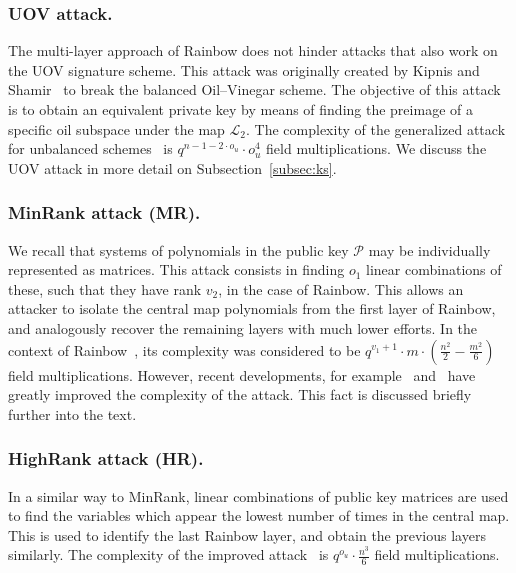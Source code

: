\documentclass[12pt, a4paper, oneside]{memoir}
\theoremstyle{definition}
\begin{document}
\subsubsection{UOV attack.} 

The multi-layer approach of Rainbow does not hinder attacks that also work on the UOV signature scheme. This attack was originally created by Kipnis and Shamir~\cite{Kipnis:199808} to break the balanced Oil--Vinegar scheme. The objective of this attack is to obtain an equivalent private key by means of finding the preimage of a specific oil subspace under the map $\mathcal{L}_{2}$. The complexity of the generalized attack for unbalanced schemes~\cite{Kipnis:199904} is $q^{n - 1 - 2 \cdot o_{u}} \cdot o_{u}^{4}$ field multiplications. We discuss the UOV attack in more detail on Subsection~\ref{subsec:ks}.

\subsubsection{MinRank attack (MR).} 

We recall that systems of polynomials in the public key $\mathcal{P}$ may be individually represented as matrices. This attack consists in finding $o_{1}$ linear combinations of these, such that they have rank $v_{2}$, in the case of Rainbow. This allows an attacker to isolate the central map polynomials from the first layer of Rainbow, and analogously recover the remaining layers with much lower efforts. In the context of Rainbow~\cite{Billet:200609,Faugere:200808}, its complexity was considered to be $q^{v_{1} + 1} \cdot m \cdot (\frac{n^{2}}{2} - \frac{m^{2}}{6})$ field multiplications. However, recent developments, for example~\cite[Tab.~3]{Bardet:202006} and~\cite{Nakamura:202007} have greatly improved the complexity of the attack. This fact is discussed briefly further into the text.

\subsubsection{HighRank attack (HR).} 

In a similar way to MinRank, linear combinations of public key matrices are used to find the variables which appear the lowest number of times in the central map. This is used to identify the last Rainbow layer, and obtain the previous layers similarly. The complexity of the improved attack~\cite{Ding:200806} is $q^{o_{u}} \cdot \frac{n^{3}}{6}$ field multiplications.
\end{document}
